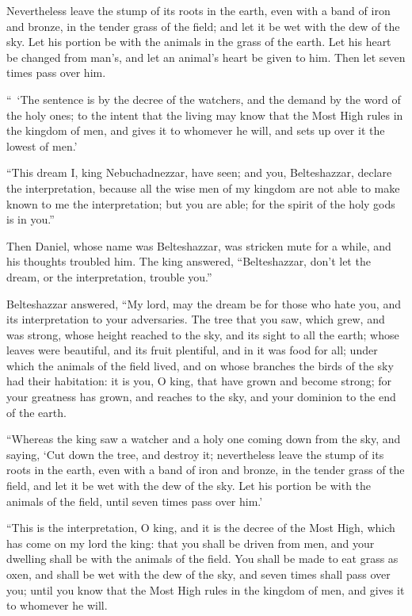 {Nevertheless leave the stump of its roots in the earth, even with a band of iron and bronze, in the tender grass of the field; and let it be wet with the dew of the sky. Let his portion be with the animals in the grass of the earth.
Let his heart be changed from man’s, and let an animal’s heart be given to him. Then let seven times pass over him.
\par }{\PI {}“ ‘The sentence is by the decree of the watchers, and the demand by the word of the holy ones; to the intent that the living may know that the Most High rules in the kingdom of men, and gives it to whomever he will, and sets up over it the lowest of men.’
\par }{\PI {}“This dream I, king Nebuchadnezzar, have seen; and you, Belteshazzar, declare the interpretation, because all the wise men of my kingdom are not able to make known to me the interpretation; but you are able; for the spirit of the holy gods is in you.”
\par }{\PI {}Then Daniel, whose name was Belteshazzar, was stricken mute for a while, and his thoughts troubled him. The king answered, “Belteshazzar, don’t let the dream, or the interpretation, trouble you.”
\par }{\PI Belteshazzar answered, “My lord, may the dream be for those who hate you, and its interpretation to your adversaries.
The tree that you saw, which grew, and was strong, whose height reached to the sky, and its sight to all the earth;
whose leaves were beautiful, and its fruit plentiful, and in it was food for all; under which the animals of the field lived, and on whose branches the birds of the sky had their habitation:
it is you, O king, that have grown and become strong; for your greatness has grown, and reaches to the sky, and your dominion to the end of the earth.
\par }{\PI {}“Whereas the king saw a watcher and a holy one coming down from the sky, and saying, ‘Cut down the tree, and destroy it; nevertheless leave the stump of its roots in the earth, even with a band of iron and bronze, in the tender grass of the field, and let it be wet with the dew of the sky. Let his portion be with the animals of the field, until seven times pass over him.’
\par }{\PI {}“This is the interpretation, O king, and it is the decree of the Most High, which has come on my lord the king:
that you shall be driven from men, and your dwelling shall be with the animals of the field. You shall be made to eat grass as oxen, and shall be wet with the dew of the sky, and seven times shall pass over you; until you know that the Most High rules in the kingdom of men, and gives it to whomever he will.
}
